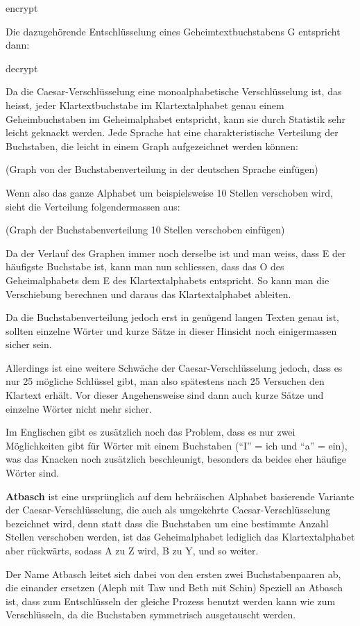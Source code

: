 encrypt

Die dazugehörende Entschlüsselung eines Geheimtextbuchstabens G entspricht dann:

decrypt

Da die Caesar-Verschlüsselung eine monoalphabetische Verschlüsselung ist, das heisst, jeder Klartextbuchstabe im Klartextalphabet genau einem Geheimbuchstaben im Geheimalphabet entspricht, kann sie durch Statistik sehr leicht geknackt werden.
Jede Sprache hat eine charakteristische Verteilung der Buchstaben, die leicht in einem Graph aufgezeichnet werden können:

(Graph von der Buchstabenverteilung in der deutschen Sprache einfügen)

Wenn also das ganze Alphabet um beispielsweise 10 Stellen verschoben wird, sieht die Verteilung folgendermassen aus:

(Graph der Buchstabenverteilung 10 Stellen verschoben einfügen)

Da der Verlauf des Graphen immer noch derselbe ist und man weiss, dass E der häufigste Buchstabe ist, kann man nun schliessen, dass das O des Geheimalphabets dem E des Klartextalphabets entspricht. So kann man die Verschiebung berechnen und daraus das Klartextalphabet ableiten.

Da die Buchstabenverteilung jedoch erst in genügend langen Texten genau ist, sollten einzelne Wörter und kurze Sätze in dieser Hinsicht noch einigermassen sicher sein.

Allerdings ist eine weitere Schwäche der Caesar-Verschlüsselung jedoch, dass es nur 25 mögliche Schlüssel gibt, man also spätestens nach 25 Versuchen den Klartext erhält. Vor dieser Angehensweise sind dann auch kurze Sätze und einzelne Wörter nicht mehr sicher.

Im Englischen gibt es zusätzlich noch das Problem, dass es nur zwei Möglichkeiten gibt für Wörter mit einem Buchstaben (\enquote{I} = ich und \enquote{a} = ein), was das Knacken noch zusätzlich beschleunigt, besonders da beides eher häufige Wörter sind.

\textbf{Atbasch} ist eine ursprünglich auf dem hebräischen Alphabet basierende Variante der Caesar-Verschlüsselung, die auch als umgekehrte Caesar-Verschlüsselung bezeichnet wird, denn statt dass die Buchstaben um eine bestimmte Anzahl Stellen verschoben werden, ist das Geheimalphabet lediglich das Klartextalphabet aber rückwärts, sodass A zu Z wird, B zu Y, und so weiter.

Der Name Atbasch leitet sich dabei von den ersten zwei Buchstabenpaaren ab, die einander ersetzen (Aleph mit Taw und Beth mit Schin)
Speziell an Atbasch ist, dass zum Entschlüsseln der gleiche Prozess benutzt werden kann wie zum Verschlüsseln, da die Buchstaben symmetrisch ausgetauscht werden.

